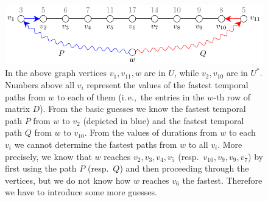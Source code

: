 \documentclass[a4paper,UKenglish,cleveref, autoref, thm-restate]{lipics-v2021}
\newcommand{\ie}{i.\,e.,\ }
\begin{document}
\begin{figure}[t]
	\centering
	\includegraphics[width=0.75\columnwidth]{fig-exampleg10}
	\caption{In the above graph vertices $v_1, v_{11}, w$ are in $U$, while $v_2, v_{10}$ are in $U^*$. 
		Numbers above all $v_i$ represent the values of the fastest temporal paths from $w$ to each of them (\ie the entries in the $w$-th row of matrix $D$).
		From the basic guesses we know the fastest temporal path $P$ from $w$ to $v_2$ (depicted in blue) and the fastest temporal path $Q$ from $w$ to $v_{10}$.
		From the values of durations from $w$ to each $v_i$ we cannot 
		determine the fastest paths from $w$ to all $v_i$.
		More precisely, we know that $w$ reaches $v_2, v_3, v_4, v_5$ (resp.~$v_{10}, v_{9}, v_{9}, v_{7}$) 
		by first using the path $P$ (resp.~$Q$) and then proceeding through the vertices,
		but we do not know how $w$ reaches $v_6$ the fastest.
		Therefore we have to introduce some more guesses.
  \label{fig:guesses-advanced}}
\end{figure}
\end{document}
